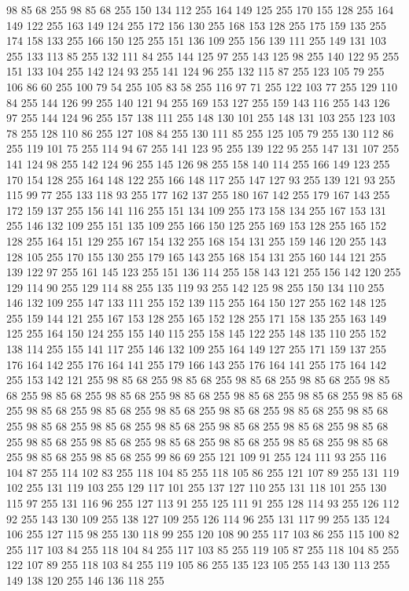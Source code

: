 98 85 68 255 98 85 68 255 150 134 112 255 164 149 125 255 170 155 128 255 164 149 122 255 163 149 124 255 172 156 130 255 168 153 128 255 175 159 135 255 174 158 133 255 166 150 125 255 151 136 109 255 156 139 111 255 149 131 103 255 133 113 85 255 132 111 84 255 144 125 97 255 143 125 98 255 140 122 95 255 151 133 104 255 142 124 93 255 141 124 96 255 132 115 87 255 123 105 79 255 106 86 60 255 100 79 54 255 105 83 58 255 116 97 71 255 122 103 77 255 129 110 84 255 144 126 99 255 140 121 94 255 169 153 127 255 159 143 116 255 143 126 97 255 144 124 96 255 157 138 111 255 148 130 101 255 148 131 103 255 123 103 78 255 128 110 86 255 127 108 84 255 130 111 85 255 125 105 79 255 130 112 86 255 119 101 75 255 114 94 67 255 141 123 95 255 139 122 95 255 147 131 107 255 141 124 98 255 142 124 96 255 145 126 98 255 158 140 114 255 166 149 123 255 170 154 128 255 164 148 122 255 166 148 117 255 147 127 93 255 139 121 93 255 115 99 77 255 133 118 93 255 177 162 137 255
180 167 142 255 179 167 143 255 172 159 137 255 156 141 116 255 151 134 109 255 173 158 134 255 167 153 131 255 146 132 109 255 151 135 109 255 166 150 125 255 169 153 128 255 165 152 128 255 164 151 129 255 167 154 132 255 168 154 131 255 159 146 120 255 143 128 105 255 170 155 130 255 179 165 143 255 168 154 131 255 160 144 121 255 139 122 97 255 161 145 123 255 151 136 114 255 158 143 121 255 156 142 120 255 129 114 90 255 129 114 88 255 135 119 93 255 142 125 98 255 150 134 110 255 146 132 109 255 147 133 111 255 152 139 115 255 164 150 127 255 162 148 125 255 159 144 121 255 167 153 128 255 165 152 128 255 171 158 135 255 163 149 125 255 164 150 124 255 155 140 115 255 158 145 122 255 148 135 110 255 152 138 114 255 155 141 117 255 146 132 109 255 164 149 127 255 171 159 137 255 176 164 142 255 176 164 141 255 179 166 143 255 176 164 141 255 175 164 142 255 153 142 121 255 98 85 68 255 98 85 68 255 98 85 68 255 98 85 68 255 98 85 68 255 98 85 68 255 98 85 68 255 98 85 68 255
98 85 68 255 98 85 68 255 98 85 68 255 98 85 68 255 98 85 68 255 98 85 68 255 98 85 68 255 98 85 68 255 98 85 68 255 98 85 68 255 98 85 68 255 98 85 68 255 98 85 68 255 98 85 68 255 98 85 68 255 98 85 68 255 98 85 68 255 98 85 68 255 98 85 68 255 98 85 68 255 98 85 68 255 98 85 68 255 98 85 68 255 99 86 69 255 121 109 91 255 124 111 93 255 116 104 87 255 114 102 83 255 118 104 85 255 118 105 86 255 121 107 89 255 131 119 102 255 131 119 103 255 129 117 101 255 137 127 110 255 131 118 101 255 130 115 97 255 131 116 96 255 127 113 91 255 125 111 91 255 128 114 93 255 126 112 92 255 143 130 109 255 138 127 109 255 126 114 96 255 131 117 99 255 135 124 106 255 127 115 98 255 130 118 99 255 120 108 90 255 117 103 86 255 115 100 82 255 117 103 84 255 118 104 84 255 117 103 85 255 119 105 87 255 118 104 85 255 122 107 89 255 118 103 84 255 119 105 86 255 135 123 105 255 143 130 113 255 149 138 120 255 146 136 118 255
